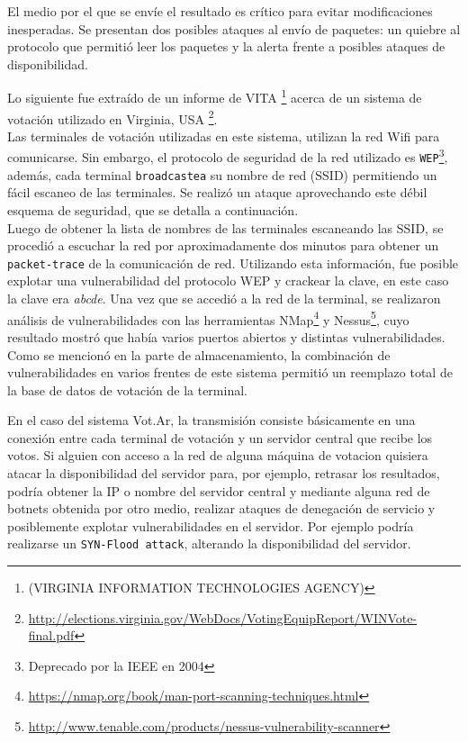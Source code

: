El medio por el que se envíe el resultado es crítico para evitar modificaciones inesperadas. Se presentan dos posibles ataques al envío de paquetes: un quiebre al protocolo que permitió leer los paquetes y la alerta frente a posibles ataques de disponibilidad.

Lo siguiente fue extraído de un informe de VITA \footnote{(VIRGINIA INFORMATION TECHNOLOGIES AGENCY)} acerca de un sistema de votación utilizado en Virginia, USA \footnote{\url{http://elections.virginia.gov/WebDocs/VotingEquipReport/WINVote-final.pdf}}.\\
Las terminales de votación utilizadas en este sistema, utilizan la red Wifi para comunicarse. Sin embargo, el protocolo de seguridad de la red utilizado es \texttt{WEP}\footnote{Deprecado por la IEEE en 2004}, además, cada terminal \texttt{broadcastea} su nombre de red (SSID) permitiendo un fácil escaneo de las terminales. Se realizó un ataque aprovechando este débil esquema de seguridad, que se detalla a continuación.\\
Luego de obtener la lista de nombres de las terminales escaneando las SSID, se procedió a escuchar la red por aproximadamente dos minutos para obtener un \texttt{packet-trace} de la comunicación de red. Utilizando esta información, fue posible explotar una vulnerabilidad del protocolo WEP y crackear la clave, en este caso la clave era \textit{abcde}. Una vez que se accedió a la red de la terminal, se realizaron análisis de vulnerabilidades con las herramientas NMap\footnote{\url{https://nmap.org/book/man-port-scanning-techniques.html}} y Nessus\footnote{\url{http://www.tenable.com/products/nessus-vulnerability-scanner}}, cuyo resultado mostró que había varios puertos abiertos y distintas vulnerabilidades. Como se mencionó en la parte de almacenamiento, la combinación de vulnerabilidades en varios frentes de este sistema permitió un reemplazo total de la base de datos de votación de la terminal.


En el caso del sistema Vot.Ar, la transmisión consiste básicamente en una conexión entre cada terminal de votación y un servidor central que recibe los votos. Si alguien con acceso a la red de alguna máquina de votacion quisiera atacar la disponibilidad del servidor para, por ejemplo, retrasar los resultados, podría obtener la IP o nombre del servidor central y mediante alguna red de botnets obtenida por otro medio, realizar ataques de denegación de servicio y posiblemente explotar vulnerabilidades en el servidor. Por ejemplo podría realizarse un \texttt{SYN-Flood attack}, alterando la disponibilidad del servidor.


